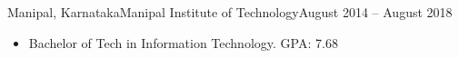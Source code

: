 \begin{cvsubsection}{Manipal, Karnataka}{Manipal Institute of Technology}{August 2014 -- August 2018}
	\begin{itemize}
		\item Bachelor of Tech in Information Technology. GPA: 7.68
	\end{itemize}
\end{cvsubsection}